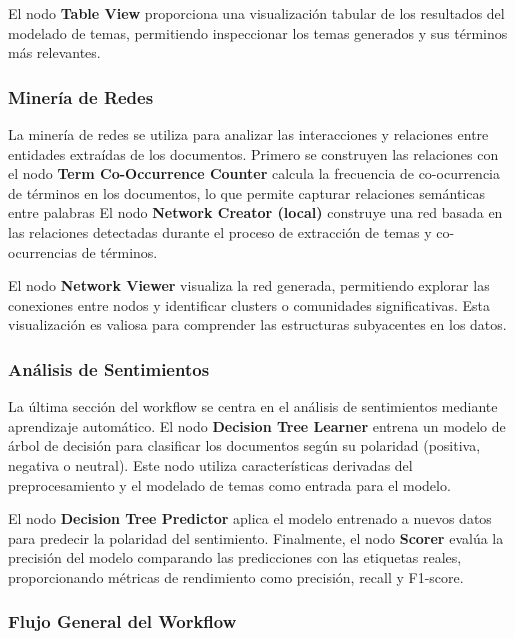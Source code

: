 El nodo \textbf{Table View} proporciona una visualización tabular de los resultados del modelado de temas, permitiendo inspeccionar los temas generados y sus términos más relevantes.

\subsubsection{Minería de Redes}


La minería de redes se utiliza para analizar las interacciones y relaciones entre entidades extraídas de los documentos. Primero se construyen las relaciones con el nodo \textbf{Term Co-Occurrence Counter} calcula la frecuencia de co-ocurrencia de términos en los documentos, lo que permite capturar relaciones semánticas entre palabras El nodo \textbf{Network Creator (local)} construye una red basada en las relaciones detectadas durante el proceso de extracción de temas y co-ocurrencias de términos.

El nodo \textbf{Network Viewer} visualiza la red generada, permitiendo explorar las conexiones entre nodos y identificar clusters o comunidades significativas. Esta visualización es valiosa para comprender las estructuras subyacentes en los datos.

\subsubsection{Análisis de Sentimientos}

La última sección del workflow se centra en el análisis de sentimientos mediante aprendizaje automático. El nodo \textbf{Decision Tree Learner} entrena un modelo de árbol de decisión para clasificar los documentos según su polaridad (positiva, negativa o neutral). Este nodo utiliza características derivadas del preprocesamiento y el modelado de temas como entrada para el modelo.

El nodo \textbf{Decision Tree Predictor} aplica el modelo entrenado a nuevos datos para predecir la polaridad del sentimiento. Finalmente, el nodo \textbf{Scorer} evalúa la precisión del modelo comparando las predicciones con las etiquetas reales, proporcionando métricas de rendimiento como precisión, recall y F1-score.

\subsubsection{Flujo General del Workflow}

